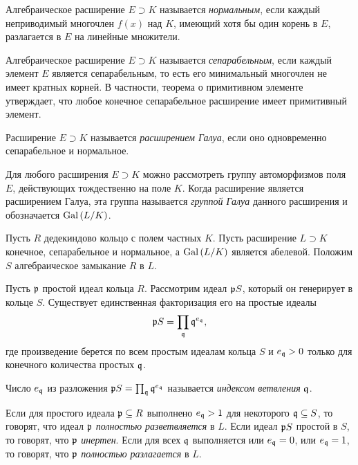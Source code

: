 \documentclass[_00_dissertation.tex]{subfiles}
\begin{document}
\begin{definition}
    Алгебраическое расширение $E \supset K$ называется \emph{нормальным}, если каждый неприводимый многочлен $f(x)$ над $K$, имеющий хотя бы один корень в $E$, разлагается в $E$ на линейные множители.

    Алгебраическое расширение $E \supset K$ называется \emph{сепарабельным}, если каждый элемент $E$ является сепарабельным, то есть его минимальный многочлен не имеет кратных корней.
    В частности, теорема о примитивном элементе утверждает, что любое конечное сепарабельное расширение имеет примитивный элемент.
    
    Расширение $E \supset K$ называется \emph{расширением Галуа}, если оно одновременно сепарабельное и нормальное.

    Для любого расширения $E \supset K$ можно рассмотреть группу автоморфизмов поля $E$, действующих тождественно на поле $K$.
    Когда расширение является расширением Галуа, эта группа называется \emph{группой Галуа} данного расширения и обозначается $\textrm{Gal}\left(L/K\right)$.
\end{definition}

Пусть $R$ дедекиндово кольцо с полем частных $K$.
Пусть расширение $L \supset K$ конечное, сепарабельное и нормальное, а $\textrm{Gal}\left(L/K\right)$ является абелевой.
Положим $S$ алгебраическое замыкание $R$ в $L$.

\begin{definition}
    Пусть $\mathfrak{p}$ простой идеал кольца $R$.
    Рассмотрим идеал $\mathfrak{p}S$, который он генерирует в кольце $S$.
    Существует единственная факторизация его на простые идеалы
    \begin{equation*}
        \mathfrak{p}S = \prod_{\mathfrak{q}} \mathfrak{q}^{e_{\mathfrak{q}}},
    \end{equation*}
    где произведение берется по всем простым идеалам кольца $S$ и $e_{\mathfrak{q}} > 0$ только для конечного количества простых $\mathfrak{q}$.

    Число $e_{\mathfrak{q}}$ из разложения $\mathfrak{p}S = \prod_{\mathfrak{q}} \mathfrak{q}^{e_{\mathfrak{q}}}$ называется \emph{индексом ветвления} $\mathfrak{q}$.

    Если для простого идеала $\mathfrak{p} \subseteq R$ выполнено $e_{\mathfrak{q}} > 1$ для некоторого $\mathfrak{q} \subseteq S$, то говорят, что идеал $\mathfrak{p}$ \emph{полностью разветвляется} в $L$.
    Если идеал $\mathfrak{p}S$ простой в $S$, то говорят, что $\mathfrak{p}$ \emph{инертен}.
    Если для всех $\mathfrak{q}$ выполняется или $e_{\mathfrak{q}} = 0$, или $e_{\mathfrak{q}} = 1$, то говорят, что $\mathfrak{p}$ \emph{полностью разлагается} в $L$.
\end{definition}
\end{document}

